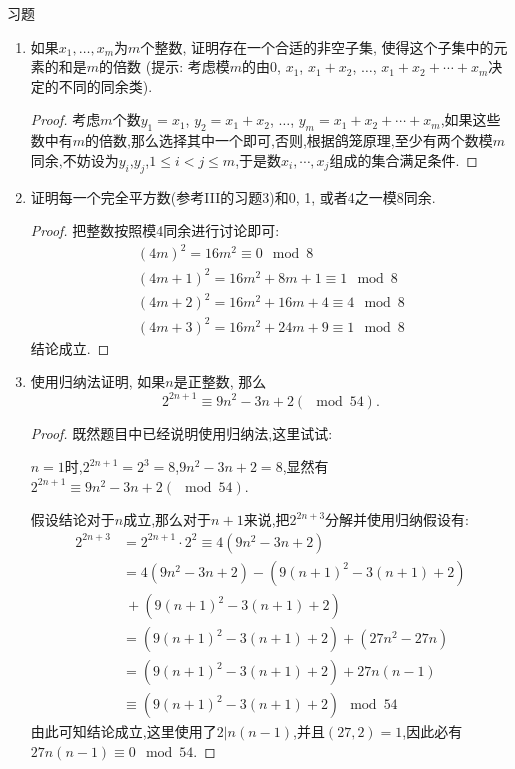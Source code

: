 \documentclass[12pt,a4paper]{book} %
\theoremstyle{remark}
\theoremstyle{example}
\theoremstyle{lemma}
\theoremstyle{corollary}
\numberwithin{theorem}{chapter}
\begin{document}
习题

\begin{enumerate}
\item 如果$x_1, \ldots, x_m$为$m$个整数, 证明存在一个合适的非空子集, 使得这个子集中的元素的和是$m$的倍数 (提示: 考虑模$m$的由$0$, $x_1$, $x_1 + x_2$, $\ldots$, $x_1 + x_2 + \cdots + x_m$决定的不同的同余类).

\begin{proof}
考虑$m$个数$y_1=x_1$, $y_2=x_1 + x_2$, $\ldots$, $y_m=x_1 + x_2 + \cdots + x_m$,如果这些数中有$m$的倍数,那么选择其中一个即可,否则,根据鸽笼原理,至少有两个数模$m$同余,不妨设为$y_i$,$y_j$,$1 \le i < j \le m$,于是数$x_i, \cdots,x_j$组成的集合满足条件.
\end{proof}

\item 证明每一个完全平方数(参考III的习题3)和0, 1, 或者4之一模8同余.

\begin{proof}
把整数按照模4同余进行讨论即可:
\begin{gather*}
(4m)^2 =16m^2 \equiv 0 \mod{8}\\
(4m+1)^2=16m^2+8m+1 \equiv 1 \mod{8} \\
(4m+2)^2=16m^2+16m+4 \equiv 4 \mod{8} \\
(4m+3)^2=16m^2+24m+9 \equiv 1 \mod{8}
\end{gather*}
结论成立.
\end{proof}

\item 使用归纳法证明, 如果$n$是正整数, 那么
\[
2^{2n + 1} \equiv 9n^2 - 3n + 2 (\mod 54).
\]

\begin{proof}
既然题目中已经说明使用归纳法,这里试试:

$n=1$时,$2^{2n+1}=2^3=8$,$9n^2 - 3n + 2=8$,显然有$2^{2n + 1} \equiv 9n^2 - 3n + 2 (\mod 54)$.

假设结论对于$n$成立,那么对于$n+1$来说,把$2^{2n+3}$分解并使用归纳假设有:
\[
\begin{aligned}
2^{2n + 3} &= 2^{2n+1} \cdot 2^2 \equiv 4(9n^2 - 3n + 2) \\
&= 4(9n^2 - 3n + 2)-(9(n+1)^2 - 3(n+1)  + 2) \\
&\ + (9(n+1)^2 - 3(n+1)  + 2)\\
&= (9(n+1)^2 - 3(n+1)  + 2) + (27n^2 -27n) \\
&= (9(n+1)^2 - 3(n+1)  + 2) + 27n(n-1) \\
&\equiv (9(n+1)^2 - 3(n+1)  + 2) \mod{54}
\end{aligned}
\]
由此可知结论成立,这里使用了$2|n(n-1)$,并且$(27,2)=1$,因此必有$27n(n-1) \equiv 0 \mod{54}$.
\end{proof}


\end{enumerate}
\end{document}
